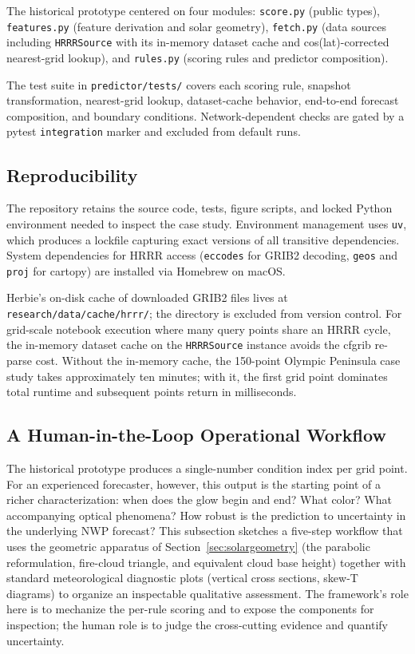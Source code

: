 \documentclass[11pt,a4paper]{article}
\begin{document}
The historical prototype centered on four modules: \texttt{score.py} (public types), \texttt{features.py} (feature derivation and solar geometry), \texttt{fetch.py} (data sources including \texttt{HRRRSource} with its in-memory dataset cache and cos(lat)-corrected nearest-grid lookup), and \texttt{rules.py} (scoring rules and predictor composition).

The test suite in \texttt{predictor/tests/} covers each scoring rule, snapshot transformation, nearest-grid lookup, dataset-cache behavior, end-to-end forecast composition, and boundary conditions. Network-dependent checks are gated by a pytest \texttt{integration} marker and excluded from default runs.

\subsection{Reproducibility}

The repository retains the source code, tests, figure scripts, and locked Python environment needed to inspect the case study. Environment management uses \texttt{uv}, which produces a lockfile capturing exact versions of all transitive dependencies. System dependencies for HRRR access (\texttt{eccodes} for GRIB2 decoding, \texttt{geos} and \texttt{proj} for cartopy) are installed via Homebrew on macOS.

Herbie's on-disk cache of downloaded GRIB2 files lives at \texttt{research/data/cache/hrrr/}; the directory is excluded from version control. For grid-scale notebook execution where many query points share an HRRR cycle, the in-memory dataset cache on the \texttt{HRRRSource} instance avoids the cfgrib re-parse cost. Without the in-memory cache, the 150-point Olympic Peninsula case study takes approximately ten minutes; with it, the first grid point dominates total runtime and subsequent points return in milliseconds.

\subsection{A Human-in-the-Loop Operational Workflow}
\label{sec:workflow}

The historical prototype produces a single-number condition index per grid point. For an experienced forecaster, however, this output is the starting point of a richer characterization: when does the glow begin and end? What color? What accompanying optical phenomena? How robust is the prediction to uncertainty in the underlying NWP forecast? This subsection sketches a five-step workflow that uses the geometric apparatus of Section~\ref{sec:solargeometry} (the parabolic reformulation, fire-cloud triangle, and equivalent cloud base height) together with standard meteorological diagnostic plots (vertical cross sections, skew-T diagrams) to organize an inspectable qualitative assessment. The framework's role here is to mechanize the per-rule scoring and to expose the components for inspection; the human role is to judge the cross-cutting evidence and quantify uncertainty.
\end{document}
